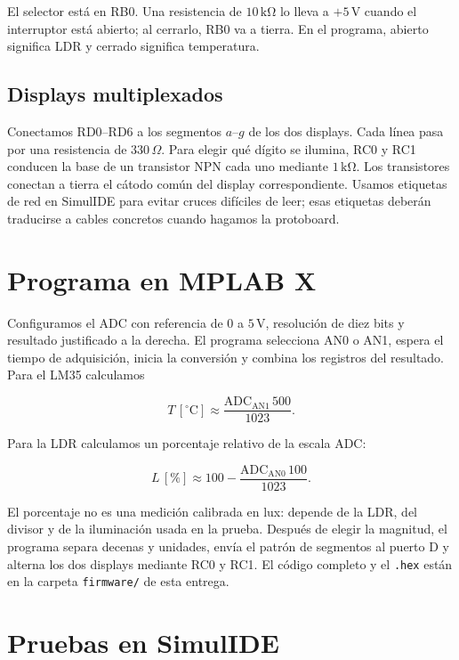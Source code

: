 \documentclass[11pt,a4paper]{article}
\begin{document}
El selector está en RB0. Una resistencia de \(10\,\mathrm{k\Omega}\) lo lleva a \(+5\,\mathrm V\) cuando el interruptor está abierto; al cerrarlo, RB0 va a tierra. En el programa, abierto significa LDR y cerrado significa temperatura.

\subsection{Displays multiplexados}

Conectamos RD0--RD6 a los segmentos $a$--$g$ de los dos displays. Cada línea pasa por una resistencia de \(330\,\Omega\). Para elegir qué dígito se ilumina, RC0 y RC1 conducen la base de un transistor NPN cada uno mediante \(1\,\mathrm{k\Omega}\). Los transistores conectan a tierra el cátodo común del display correspondiente. Usamos etiquetas de red en SimulIDE para evitar cruces difíciles de leer; esas etiquetas deberán traducirse a cables concretos cuando hagamos la protoboard.

\section{Programa en MPLAB X}

Configuramos el ADC con referencia de \(0\) a \(5\,\mathrm V\), resolución de diez bits y resultado justificado a la derecha. El programa selecciona AN0 o AN1, espera el tiempo de adquisición, inicia la conversión y combina los registros del resultado. Para el LM35 calculamos

\begin{equation}
  T\,[{}^\circ\mathrm C] \approx \frac{\mathrm{ADC}_{\mathrm{AN1}}\,500}{1023}.
\end{equation}

Para la LDR calculamos un porcentaje relativo de la escala ADC:

\begin{equation}
  L\,[\%] \approx 100 - \frac{\mathrm{ADC}_{\mathrm{AN0}}\,100}{1023}.
\end{equation}

El porcentaje no es una medición calibrada en lux: depende de la LDR, del divisor y de la iluminación usada en la prueba. Después de elegir la magnitud, el programa separa decenas y unidades, envía el patrón de segmentos al puerto D y alterna los dos displays mediante RC0 y RC1. El código completo y el \texttt{.hex} están en la carpeta \texttt{firmware/} de esta entrega.

\section{Pruebas en SimulIDE}
\end{document}
